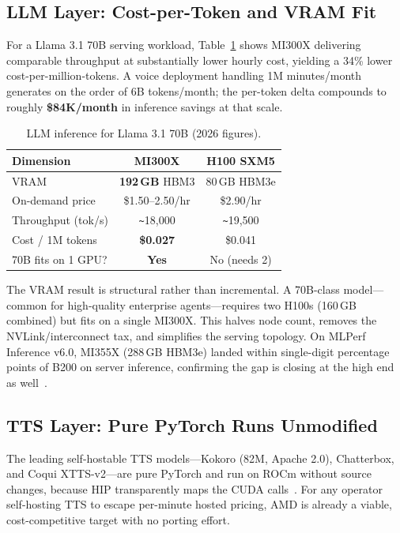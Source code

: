 \documentclass[blind]{gtac}
\begin{document}
\subsection{LLM Layer: Cost-per-Token and VRAM Fit}
For a Llama 3.1 70B serving workload, Table~\ref{tab:llm} shows MI300X delivering comparable throughput at substantially lower hourly cost, yielding a 34\% lower cost-per-million-tokens. A voice deployment handling 1M minutes/month generates on the order of 6B tokens/month; the per-token delta compounds to roughly \textbf{\$84K/month} in inference savings at that scale.

\begin{table}[t]
\centering
\caption{LLM inference for Llama 3.1 70B (2026 figures).}
\label{tab:llm}
\footnotesize
\begin{tabular}{@{}lcc@{}}
\toprule
Dimension & MI300X & H100 SXM5 \\
\midrule
VRAM & \textbf{192\,GB} HBM3 & 80\,GB HBM3e \\
On-demand price & \$1.50--2.50/hr & \$2.90/hr \\
Throughput (tok/s) & \texttt{\textasciitilde}18{,}000 & \texttt{\textasciitilde}19{,}500 \\
Cost / 1M tokens & \textbf{\$0.027} & \$0.041 \\
70B fits on 1 GPU? & \textbf{Yes} & No (needs 2) \\
\bottomrule
\end{tabular}
\end{table}

The VRAM result is structural rather than incremental. A 70B-class model---common for high-quality enterprise agents---requires two H100s (160\,GB combined) but fits on a single MI300X. This halves node count, removes the NVLink/interconnect tax, and simplifies the serving topology. On MLPerf Inference v6.0, MI355X (288\,GB HBM3e) landed within single-digit percentage points of B200 on server inference, confirming the gap is closing at the high end as well~\cite{mlperf6}.

\subsection{TTS Layer: Pure PyTorch Runs Unmodified}
The leading self-hostable TTS models---Kokoro (82M, Apache 2.0), Chatterbox, and Coqui XTTS-v2---are pure PyTorch and run on ROCm without source changes, because HIP transparently maps the CUDA calls~\cite{bentoml_tts}. For any operator self-hosting TTS to escape per-minute hosted pricing, AMD is already a viable, cost-competitive target with no porting effort.
\end{document}
